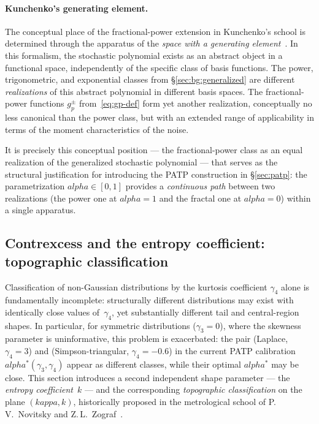\documentclass[11pt]{article}
\def\alpha{alpha}%
\def\varkappa{kappa}%
\theoremstyle{definition}
\begin{document}
\paragraph{Kunchenko's generating element.}
The conceptual place of the fractional-power extension in Kunchenko's school
is determined through the apparatus of the \emph{space with a generating
element}~\citep{kunchenko2005poligen}. In this
formalism, the stochastic polynomial exists as an abstract object in a
functional space, independently of the specific class of basis functions.
The power, trigonometric, and exponential classes from
\S\ref{sec:bg:generalized} are different \emph{realizations} of this
abstract polynomial in different basis spaces. The fractional-power functions
$g_{p}^{\pm}$ from~\eqref{eq:gp-def} form yet another realization,
conceptually no less canonical than the power class, but with an extended
range of applicability in terms of the moment characteristics of the noise.

It is precisely this conceptual position --- the fractional-power class as an
equal realization of the generalized stochastic polynomial --- that serves as
the structural justification for introducing the PATP construction in
\S\ref{sec:patp}: the parametrization $\alpha \in [0, 1]$ provides a
\emph{continuous path} between two realizations (the power one at
$\alpha = 1$ and the fractal one at $\alpha = 0$) within a single apparatus.

\subsection{Contrexcess and the entropy coefficient: topographic classification}\label{sec:bg:entropy}

Classification of non-Gaussian distributions by the kurtosis coefficient
$\gamma_4$ alone is fundamentally incomplete: structurally different
distributions may exist with identically close values of~$\gamma_4$, yet
substantially different tail and central-region shapes. In particular, for
symmetric distributions ($\gamma_3 = 0$), where the skewness parameter is
uninformative, this problem is exacerbated: the pair (Laplace, $\gamma_4 = 3$)
and (Simpson-triangular, $\gamma_4 = -0.6$) in the current PATP calibration
$\alpha^{*}(\gamma_3, \gamma_4)$ appear as different classes, while their
optimal $\alpha^{*}$ may be close. This section introduces a second
independent shape parameter --- the \emph{entropy coefficient}~$k$ --- and
the corresponding \emph{topographic classification} on the plane
$(\varkappa, k)$, historically proposed in the metrological school of
P.\,V.~Novitsky and Z.\,L.~Zograf~\citep{novitsky1991errors}.
\end{document}
